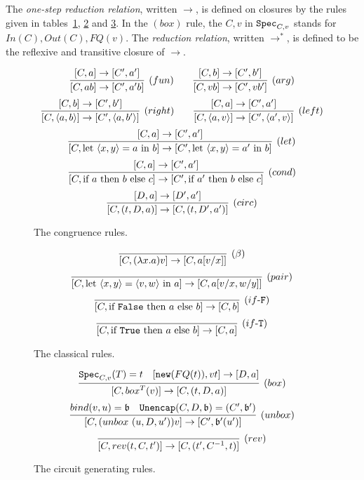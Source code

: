 \documentclass{article}
\begin{document}

\begin{definition}
The \emph{one-step reduction relation}, written $\to$, is defined 
on closures by the rules given in tables~\hyperref[cong_rules]{\ref*{cong_rules}}, 
\hyperref[classical_rules]{\ref*{classical_rules}} 
and \hyperref[circ_gen_rules]{\ref*{circ_gen_rules}}. 
In the $(box)$ rule, the $C,v$ in $\texttt{Spec}_{C,v}$ stands for $In(C),Out(C),FQ(v)$.
The \emph{reduction relation}, 
written $\to^*$, is defined to be the reflexive and transitive closure of $\to$.
\end{definition}

\begin{figure}[!ht]
\begin{mdframed}
\[
  \infer[(fun)]{[C,ab]\to[C',a'b]}{
    [C,a]\to[C',a']
  }
~~~~~~
  \infer[(arg)]{[C,vb]\to [C',vb']}{
    [C,b]\to [C',b']
  }
\]
\[
  \infer[(right)]{[C,\langle a,b\rangle]\to [C',\langle a,b'\rangle]}{
    [C,b]\to [C',b']
  }
~~~~~~
  \infer[(left)]{[C,\langle a,v\rangle]\to [C',\langle a',v\rangle]}{
    [C,a]\to [C',a']
  }
\]
\[
  \infer[(let)]{[C,\letin{\p{x,y}}{a}{b}]\to 
                [C', \letin{\p{x,y}}{a'}{b}]}{
    [C,a]\to [C',a']
  }
\]
\[
  \infer[(cond)]{[C, \ifthenelse{a}{b}{c}]\to [C', \ifthenelse{a'}{b}{c}]}{
    [C,a]\to [C',a']
  }
\]
\[
  \infer[(circ)]{[C, (t,D,a)]\to [C, (t,D',a')]}{
    [D,a]\to [D',a']
  }
\]
\end{mdframed}
\caption{The congruence rules.}
\label{cong_rules}
\end{figure}

\begin{figure}[!ht]
\begin{mdframed}
\[
  \infer[(\beta)]{[C,(\lambda x.a)v]\to [C, a[v/x]]}{}
\]
\[
  \infer[(pair)]{[C,\letin{\p{x,y}}{\p{v,w}}{a}]\to[C,a[v/x,w/y]]}{}
\]
\[
  \infer[(if\mbox{-}\mathtt{F})]{[C,\ifthenelse{\mathtt{False}}{a}{b}] \to [C, b]}{}
\]
\[
  \infer[(if\mbox{-}\mathtt{T})]{[C,\ifthenelse{\mathtt{True}}{a}{b}] \to [C, a]}{}
\]
\end{mdframed}
\caption{The classical rules.}
\label{classical_rules}
\end{figure}

\begin{figure}[!ht]
\begin{mdframed}
\[
  \infer[(box)]{[C,box^T(v)]\to [C,(t,D,a)]}{
    \spec_{C,v}(T)=t
    &
    [\mathtt{new}(FQ(t)), vt] \to [D,a]
  }
\]
\[
  \infer[(unbox)]{[C,(unbox~(u,D,u'))v]\to [C',\binding'(u')]}{
    bind(v,u)=\binding 
    &
    \mathtt{Unencap}(C,D,\binding) = (C',\binding') 
  }
\]
\[
  \infer[(rev)]{[C,rev (t,C,t')]\to [C,(t',C^{-1},t)]}{}
\]
\end{mdframed}
\caption{The circuit generating rules.}
\label{circ_gen_rules}
\end{figure}
\end{document}
